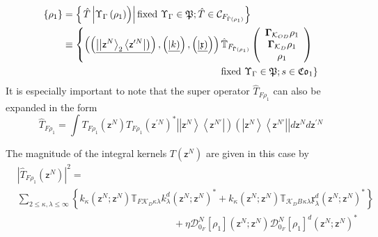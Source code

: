 \documentclass[aps,preprint]{revtex4}%
\begin{document}
\begin{align}
\left\{  \rho_{1}\right\}   &  =\left\{  \left.  \hat{T}\left\vert \overset
{}{\Upsilon_{\Gamma}\left(  \rho_{1}\right)  }\right)  \right\vert \text{fixed
}\Upsilon_{\Gamma}\in\mathfrak{P};\hat{T}\in\mathcal{C}_{F_{\tilde{\Gamma
}\left(  \rho_{1}\right)  }}\right\} \nonumber\\
&  \equiv\left\{  \left(  \left(  \underline{\left\vert \left\vert
\mathsf{z}^{N}\right\rangle _{2}\left\langle \mathsf{z}^{\prime N}\right\vert
\right)  }\right)  ,\left(  \underline{\left\vert k\right)  }\right)  ,\left(
\underline{\left\vert \mathfrak{x}\right)  }\right)  \right)  \mathbb{\hat{T}%
}_{F_{\tilde{\Gamma}\left(  \rho_{1}\right)  }}\left(
\begin{array}
[c]{c}%
\mathbf{\Gamma}_{\mathcal{K}_{OD}}\rho_{1}\\
\mathbf{\Gamma}_{\mathcal{K}_{D}}\rho_{1}\\
\rho_{1}%
\end{array}
\right)  \right. \nonumber\\
&  \qquad\qquad\qquad\qquad\qquad\qquad\qquad\qquad\left.  \text{fixed
}\Upsilon_{\Gamma}\in\mathfrak{P};s\in\mathfrak{Co}_{1}\right\}
\end{align}
It is especially important to note that the super operator $\hat{T}_{F\rho
_{1}}$ can also be expanded in the form
\begin{equation}
\hat{T}_{F\rho_{1}}=\int T_{F\rho_{1}}\left(  \mathsf{z}^{N}\right)
T_{F\rho_{1}}\left(  \mathsf{z}^{\prime N}\right)  ^{\ast}\left\vert
\left\vert \mathsf{z}^{N}\right\rangle \left\langle \mathsf{z}^{N\prime
}\right\vert \right)  \left(  \left\vert \mathsf{z}^{N}\right\rangle
\left\langle \mathsf{z}^{N\prime}\right\vert \right\vert d\mathsf{z}%
^{N}d\mathsf{z}^{\prime N}%
\end{equation}


The magnitude of the integral kernels $T\left(  \mathsf{z}^{N}\right)  $ are
given in this case by
\begin{align}
&  \left\vert \hat{T}_{F\rho_{1}}\left(  \mathsf{z}^{N}\right)  \right\vert
^{2}=\nonumber\\
&  \sum_{2\leq\kappa,\lambda\leq\infty}\left\{  k_{\kappa}\left(
\mathsf{z}^{N};\mathsf{z}^{N}\right)  \mathbb{T}_{F\mathcal{K}_{D}%
\kappa\lambda}k_{\lambda}^{d}\left(  \mathsf{z}^{N};\mathsf{z}^{N}\right)
^{\ast}+k_{\kappa}\left(  \mathsf{z}^{N};\mathsf{z}^{N}\right)  \mathbb{T}%
_{\mathcal{K}_{D}B}{}_{\kappa\lambda}\mathfrak{x}_{\lambda}^{d}\left(
\mathsf{z}^{N};\mathsf{z}^{N}\right)  ^{\ast}\right\} \nonumber\\
&  \qquad\qquad\qquad\qquad\qquad\qquad\qquad\qquad+\eta\mathcal{D}_{0_{F}%
}^{N}\left[  \rho_{1}\right]  \left(  \mathsf{z}^{N};\mathsf{z}^{N}\right)
\mathcal{D}_{0_{F}}^{N}\left[  \rho_{1}\right]  ^{d}\left(  \mathsf{z}%
^{N};\mathsf{z}^{N}\right)  ^{\ast}%
\end{align}
\end{document}
